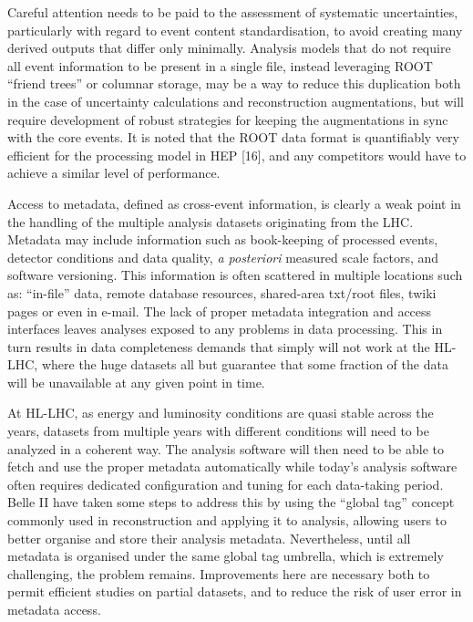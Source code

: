 \documentclass[11pt,a4paper]{article}
\begin{document}
Careful attention needs to be paid to the assessment of systematic
uncertainties, particularly with regard to event content
standardisation, to avoid creating many derived outputs that differ only
minimally. Analysis models that do not require all event information to
be present in a single file, instead leveraging ROOT ``friend trees'' or
columnar storage, may be a way to reduce this duplication both in the
case of uncertainty calculations and reconstruction augmentations, but
will require development of robust strategies for keeping the
augmentations in sync with the core events. It is noted that the ROOT
data format is quantifiably very efficient for the processing model in
HEP {[}16{]}, and any competitors would have to achieve a similar level
of performance.

Access to metadata, defined as cross-event information, is clearly a
weak point in the handling of the multiple analysis datasets originating
from the LHC. Metadata may include information such as book-keeping of
processed events, detector conditions and data quality, \emph{a
posteriori} measured scale factors, and software versioning. This
information is often scattered in multiple locations such as:
``in-file'' data, remote database resources, shared-area txt/root files,
twiki pages or even in e-mail. The lack of proper metadata integration
and access interfaces leaves analyses exposed to any problems in data
processing. This in turn results in data completeness demands that
simply will not work at the HL-LHC, where the huge datasets all but
guarantee that some fraction of the data will be unavailable at any
given point in time.

At HL-LHC, as energy and luminosity conditions are quasi stable across
the years, datasets from multiple years with different conditions will
need to be analyzed in a coherent way. The analysis software will then
need to be able to fetch and use the proper metadata automatically while
today's analysis software often requires dedicated configuration and
tuning for each data-taking period. Belle II have taken some steps to
address this by using the ``global tag'' concept commonly used in
reconstruction and applying it to analysis, allowing users to better
organise and store their analysis metadata. Nevertheless, until all
metadata is organised under the same global tag umbrella, which is
extremely challenging, the problem remains. Improvements here are
necessary both to permit efficient studies on partial datasets, and to
reduce the risk of user error in metadata access.
\end{document}
